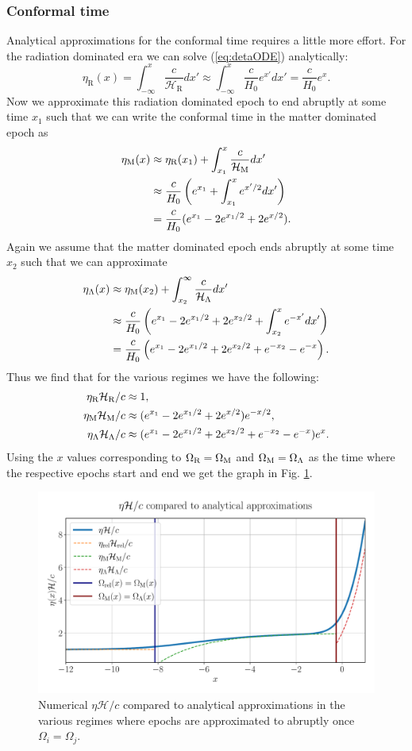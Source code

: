 \documentclass[%
reprint,
 amsmath,amssymb,
 aps,
]{revtex4-2}
\newcommand{\Hp}{\mathcal{H}}
\begin{document}
\subsubsection{Conformal time}
Analytical approximations for the conformal time requires a little more effort. For the radiation dominated era we can solve (\ref{eq:detaODE}) analytically:
\[\eta_\text{R}(x)=\int_{-\infty}^x\frac{c}{\Hp_\text{R}}dx'\approx\int_{-\infty}^x\frac{c}{H_0}e^{x'}dx'=\frac{c}{H_0}e^x.\]
Now we approximate this radiation dominated epoch to end abruptly at some time $x_1$ such that we can write the conformal time in the matter dominated epoch as
\begin{align*}
	\eta_\text M(x)&\approx\eta_\text{R}(x_1)+\int_{x_1}^x\frac{c}{\Hp_\text M}dx'\\
	&\approx\frac{c}{H_0}\left(e^{x_1}+\int_{x_1}^xe^{x'/2}dx' \right)\\
	&=\frac{c}{H_0}(e^{x_1}-2e^{x_1/2}+2e^{x/2}).
\end{align*}
Again we assume that the matter dominated epoch ends abruptly at some time $x_2$ such that we can approximate
\begin{align*}
	\eta_\Lambda(x)&\approx\eta_\text M(x_2)+\int_{x_2}^\infty\frac{c}{\Hp_\Lambda}dx'\\
	&\approx\frac{c}{H_0}\left(e^{x_1}-2e^{x_1/2}+2e^{x_2/2}+\int_{x_2}^x e^{-x'}dx' \right)\\
	&=\frac{c}{H_0}\left(e^{x_1}-2e^{x_1/2}+2e^{x_2/2}+e^{-x_2}-e^{-x} \right).
\end{align*}
Thus we find that for the various regimes we have the following:
\begin{align*}
	\eta_\text{R}\Hp_\text{R}/c&\approx1,\\
	\eta_\text M\Hp_\text M/c&\approx(e^{x_1}-2e^{x_1/2}+2e^{x/2})e^{-x/2},\\
	\eta_\Lambda\Hp_\Lambda/c&\approx(e^{x_1}-2e^{x_1/2}+2e^{x_2/2}+e^{-x_2}-e^{-x})e^{x}.
\end{align*}
Using the $x$ values corresponding to $\Omega_{\text{R}}=\Omega_\text M$ and $\Omega_{\text M}=\Omega_\Lambda$ as the time where the respective epochs start and end we get the graph in Fig. \ref{fig:eta_vs_anal_merge}.
\begin{figure}[ht!]
	\includegraphics[width = \linewidth]{Figures/Eta_vs_anal_merge.pdf}
	\caption{Numerical $\eta\Hp/c$ compared to analytical approximations in the various regimes where epochs are approximated to abruptly once $\Omega_i=\Omega_j$.}
	\label{fig:eta_vs_anal_merge}
\end{figure}
\end{document}
